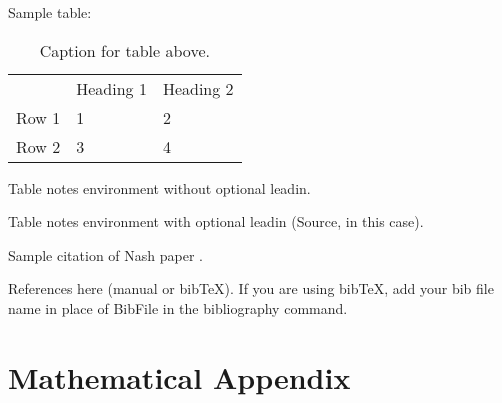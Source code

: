 \documentclass[AEJ]{AEA}
\begin{document}
Sample table:

\begin{table}
\caption{Caption for table above.}

\begin{tabular}{lll}
& Heading 1 & Heading 2 \\ 
Row 1 & 1 & 2 \\ 
Row 2 & 3 & 4%
\end{tabular}
\begin{tablenotes}
Table notes environment without optional leadin.
\end{tablenotes}
\begin{tablenotes}[Source]
Table notes environment with optional leadin (Source, in this case).
\end{tablenotes}
\end{table}

Sample citation of Nash paper \cite{Nash}.

References here (manual or bibTeX). If you are using bibTeX, add your bib file 
name in place of BibFile in the bibliography command.



\appendix

\section{Mathematical Appendix}
\end{document}
